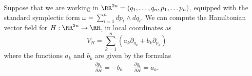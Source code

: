 

    Suppose that we are working in $\RR^{2n}=(q_1,  \ldots , q_n,p_1,  \ldots p_n)  $,  equipped with the standard symplectic form $\omega= \sum_{i=1}^n dp_i \wedge dq_i$.
    We can compute the Hamiltonian vector field for $H: \RR^{2n}\to \RR$,  in local coordinates as  \[V_H=\sum_{k=1}^n \left(a_k \partial_{q_k}+b_k \partial_{p_k}\right)\] where the functions $a_k$ and $b_k$ are given by the formulas
\begin{align*}
    \frac{\partial p_k}{\partial H}=-b_k & & \frac{\partial q_k}{\partial H}=a_k.
    \end{align*}

